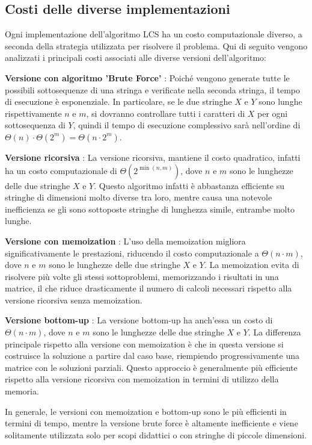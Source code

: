 	\subsection{Costi delle diverse implementazioni}
Ogni implementazione dell'algoritmo LCS ha un costo computazionale diverso, a seconda della strategia utilizzata per risolvere il problema. Qui di seguito vengono analizzati i principali costi associati alle diverse versioni dell'algoritmo:
	
	\begin{DESC}{1} 
		\item[\textbf{Versione con algoritmo 'Brute Force'}]: Poiché vengono generate tutte le possibili sottosequenze di una stringa e verificate nella seconda stringa, il tempo di esecuzione è esponenziale. In particolare, se le due stringhe $X$ e $Y$ sono lunghe rispettivamente $n$ e $m$, si dovranno controllare tutti i caratteri di $X$ per ogni sottosequenza di $Y$, quindi il tempo di esecuzione complessivo sarà nell'ordine di $\Theta(n) \cdot \Theta(2^m) =\Theta(n \cdot 2^m)$.
		\item[\textbf{Versione ricorsiva}]: La versione ricorsiva, mantiene il costo quadratico, infatti ha un costo computazionale di $\Theta(2^{\min(n, m)})$, dove $n$ e $m$ sono le lunghezze delle due stringhe $X$ e $Y$. Questo algoritmo infatti è abbastanza efficiente su stringhe di dimensioni molto diverse tra loro, mentre causa una notevole inefficienza se gli sono sottoposte stringhe di lunghezza simile, entrambe molto lunghe.
		\item[\textbf{Versione con memoization}]: L'uso della memoization migliora significativamente le prestazioni, riducendo il costo computazionale a $\Theta(n \cdot m)$, dove $n$ e $m$ sono le lunghezze delle due stringhe $X$ e $Y$. La memoization evita di risolvere più volte gli stessi sottoproblemi, memorizzando i risultati in una matrice, il che riduce drasticamente il numero di calcoli necessari rispetto alla versione ricorsiva senza memoization.
		\item[\textbf{Versione bottom-up}]: La versione bottom-up ha anch'essa un costo di $\Theta(n \cdot m)$, dove $n$ e $m$ sono le lunghezze delle due stringhe $X$ e $Y$. La differenza principale rispetto alla versione con memoization è che in questa versione si costruisce la soluzione a partire dal caso base, riempiendo progressivamente una matrice con le soluzioni parziali. Questo approccio è generalmente più efficiente rispetto alla versione ricorsiva con memoization in termini di utilizzo della memoria.
	\end{DESC}
In generale, le versioni con memoization e bottom-up sono le più efficienti in termini di tempo, mentre la versione brute force è altamente inefficiente e viene solitamente utilizzata solo per scopi didattici o con stringhe di piccole dimensioni.
	

